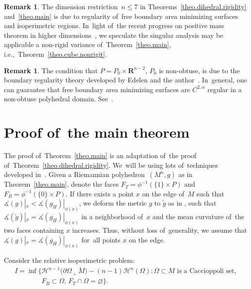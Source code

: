 \documentclass[10pt,a4paper]{amsart}
\numberwithin{equation}{section}
\theoremstyle{definition}
\newtheorem{rema}[prop]{Remark}
\newcommand{\RR}{\mathbf{R}}
\newcommand{\cH}{\mathcal H}
\begin{document}
\begin{rema}
The dimension restriction~$n\le 7$ in Theorems~\ref{theo.dihedral.rigidity} and~\ref{theo.main} is due to regularity of~free boundary area minimizing surfaces and isoperimetric regions. In~light of~the recent progress on positive mass theorem in higher dimensions~\cite{SchoenYau2017positive}, we speculate the singular analysis may be applicable a non-rigid variance of~Theorem~\ref{theo.main}, i.e.,~Theorem~\ref{theo.cube.nonrigit}.
\end{rema}

\begin{rema}
The condition that $P=P_0\times \RR^{n-2}$, $P_0$ is non-obtuse, is due to the boundary regularity theory developed by Edelen and the author~\cite{EdelenLi2020regularity}. In~general, one can guarantee that free boundary area minimizing surfaces are $C^{2,\alpha}$ regular in a non-obtuse polyhedral domain. See~\cite[Section~9]{EdelenLi2020regularity}.
\end{rema}



\section{Proof of~the main theorem}

The proof of~Theorem~\ref{theo.main} is an adaptation of~the proof of~Theorem~\ref{theo.dihedral.rigidity}. We~will be using lots of~techniques developed in~\cite{li2019dihedral}. Given a Riemannian polyhedron~$(M^n,g)$ as in Theorem~\ref{theo.main}, denote the faces $F_T=\phi^{-1}(\{1\}\times P)$ and~$F_B=\phi^{-1}(\{0\}\times P)$. If there exists a point $x$ on the edge of~$M$ such that $\measuredangle(g)|_x<\measuredangle(g_H)|_{\phi(x)}$, we deform the metric $g$ to $\tilde{g}$ as in \cite[Section~11]{Gromov2018Metric}, such that $\measuredangle(\tilde{g})|_x=\measuredangle(g_H)|_{\phi(x)}$ in a neighborhood of~$x$ and the mean curvature of~the two faces containing $x$ increases. Thus, without loss of~generality, we assume that $\measuredangle(g)|_x=\measuredangle(g_H)|_{\phi(x)}$ for~all points $x$ on the edge.


Consider the relative isoperimetric problem:
\begin{gather}
I=\inf\big\{\cH^{n-1}\big(\partial \Omega\llcorner \mathring{M}\big)-(n-1)\cH^n(\Omega)\colon
\Omega\subset M \text{ is a Caccioppoli set},\nonumber
\\ \phantom{I=\inf\{}
F_B\subset \Omega,\, F_T\cap \Omega=\varnothing\big\}.\label{problem.variation}
\end{gather}
\end{document}
